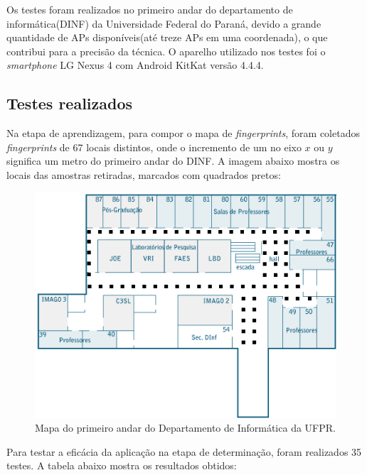   Os testes foram realizados no primeiro andar do departamento de informática(DINF) da Universidade Federal do Paraná, devido a 
  grande quantidade de APs disponíveis(até treze APs em uma coordenada), o que contribui para a precisão da técnica.
  O aparelho utilizado nos testes foi o \textit{smartphone} LG Nexus 4 com Android KitKat versão 4.4.4.
  \clearpage
  \subsection{Testes realizados}
  Na etapa de aprendizagem, para compor o mapa de \textit{fingerprints}, foram coletados \textit{fingerprints} de 67 locais distintos,
  onde o incremento de um no eixo $x$ ou $y$ significa um metro do primeiro andar do DINF. 
  A imagem abaixo mostra os locais das amostras retiradas, marcados com quadrados pretos:
   
   \begin{figure}[hbt]
  \centering
  \includegraphics[scale=0.9]{images/TTmapadinf_andar1_492x327.png}
  \caption{Mapa do primeiro andar do Departamento de Informática da UFPR.}
  \label{fig:mapaDinf}
  \end{figure}
     \clearpage
     
     Para testar a eficácia da aplicação na etapa de determinação, 
     foram realizados 35 testes. A tabela abaixo mostra os resultados obtidos:
     
